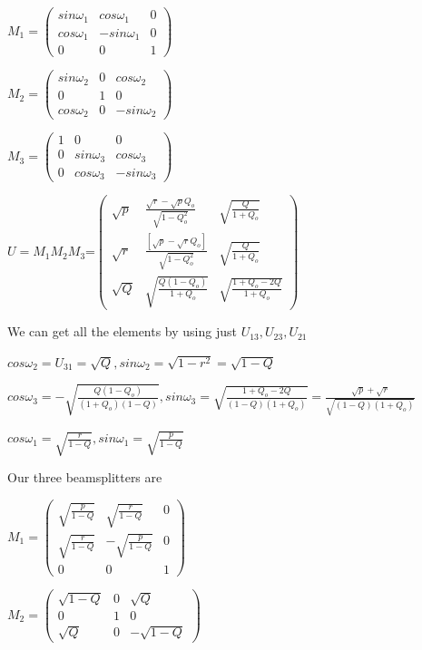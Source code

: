\documentclass[12pt,oneside,english,reqno]{amsbook}
\numberwithin{section}{chapter}
\numberwithin{equation}{section}
\numberwithin{figure}{section}
\begin{document}
$M_{1}=\begin{pmatrix}sin\omega_{1} & cos\omega_{1} & 0\\
cos\omega_{1} & -sin\omega_{1} & 0\\
0 & 0 & 1
\end{pmatrix}$

$M_{2}=\begin{pmatrix}sin\omega_{2} & 0 & cos\omega_{2}\\
0 & 1 & 0\\
cos\omega_{2} & 0 & -sin\omega_{2}
\end{pmatrix}$

$M_{3}=\begin{pmatrix}1 & 0 & 0\\
0 & sin\omega_{3} & cos\omega_{3}\\
0 & cos\omega_{3} & -sin\omega_{3}
\end{pmatrix}$

$U=M_{1}M_{2}M_{3}$=$\begin{pmatrix}\sqrt{p} & \frac{\sqrt{r}-\sqrt{p}Q_{o}}{\sqrt{1-Q_{o}^{2}}} & \sqrt{\frac{Q}{1+Q_{o}}}\\
\sqrt{r} & \frac{[\sqrt{p}-\sqrt{r}Q_{o}]}{\sqrt{1-Q_{o}^{2}}} & \sqrt{\frac{Q}{1+Q_{o}}}\\
\sqrt{Q} & \sqrt{\frac{Q(1-Q_{o})}{1+Q_{o}}} & \sqrt{\frac{1+Q_{o}-2Q}{1+Q_{o}}}
\end{pmatrix}$

We can get all the elements by using just $U_{13},U_{23},U_{21}$ 

$cos\omega_{2}=U_{31}=\sqrt{Q},sin\omega_{2}=\sqrt{1-r^{2}}=\sqrt{1-Q}$ 

$cos\omega_{3}=-\sqrt{\frac{Q(1-Q_{o})}{(1+Q_{o})(1-Q)}},sin\omega_{3}=\sqrt{\frac{1+Q_{o}-2Q}{(1-Q)(1+Q_{o})}}=\frac{\sqrt{p}+\sqrt{r}}{\sqrt{(1-Q)(1+Q_{o})}}$ 

$cos\omega_{1}=\sqrt{\frac{r}{1-Q}},sin\omega_{1}=\sqrt{\frac{p}{1-Q}}$ 

Our three beamsplitters are

$M_{1}=\begin{pmatrix}\sqrt{\frac{p}{1-Q}} & \sqrt{\frac{r}{1-Q}} & 0\\
\sqrt{\frac{r}{1-Q}} & -\sqrt{\frac{p}{1-Q}} & 0\\
0 & 0 & 1
\end{pmatrix}$

$M_{2}=\begin{pmatrix}\sqrt{1-Q} & 0 & \sqrt{Q}\\
0 & 1 & 0\\
\sqrt{Q} & 0 & -\sqrt{1-Q}
\end{pmatrix}$
\end{document}
